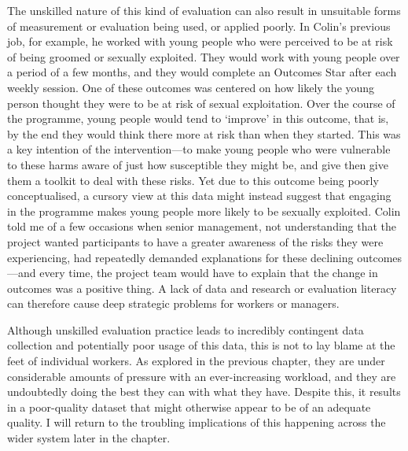 The unskilled nature of this kind of evaluation can also result in unsuitable forms of measurement or evaluation being used, or applied poorly. In Colin's previous job, for example, he worked with young people who were perceived to be at risk of being groomed or sexually exploited. They would work with young people over a period of a few months, and they would complete an Outcomes Star after each weekly session. One of these outcomes was centered on how likely the young person thought they were to be at risk of sexual exploitation. Over the course of the programme, young people would tend to `improve' in this outcome, that is, by the end they would think there more at risk than when they started. This was a key intention of the intervention—to make young people who were vulnerable to these harms aware of just how susceptible they might be, and give then give them a toolkit to deal with these risks. Yet due to this outcome being poorly conceptualised, a cursory view at this data might instead suggest that engaging in the programme makes young people more likely to be sexually exploited. Colin told me of a few occasions when senior management, not understanding that the project wanted participants to have a greater awareness of the risks they were experiencing, had repeatedly demanded explanations for these declining outcomes—and every time, the project team would have to explain that the change in outcomes was a positive thing. A lack of data and research or evaluation literacy can therefore cause deep strategic problems for workers or  managers.

Although unskilled evaluation practice leads to incredibly contingent data collection and potentially poor usage of this data, this is not to lay blame at the feet of individual workers. As explored in the previous chapter, they are under considerable amounts of pressure with an ever-increasing workload, and they are undoubtedly doing the best they can with what they have. Despite this, it results in a poor-quality dataset that might otherwise appear to be of an adequate quality. I will return to the troubling implications of this happening across the wider system later in the chapter.

